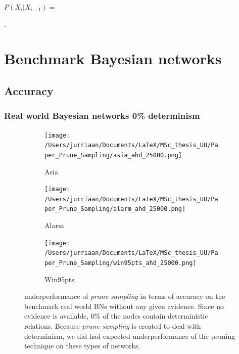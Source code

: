 \documentclass[a4paper, twoside, 11pt]{report}
\theoremstyle{plain}
\theoremstyle{definition}
\theoremstyle{remark}
\newcommand{\ps}{\textit{prune sampling }}
\begin{document}
\vspace{2pc}
$P(X_i |X_{i-1})=$
\begin{table}[h]
\centering
{}.
\caption{a block shaped CPT}
\label{block}
\end{table}

\section{Benchmark Bayesian networks}
\subsection{Accuracy}
\subsubsection{Real world Bayesian networks 0\% determinism}\label{real_world_no_evidence}

\begin{figure}[H]
\centering
\begin{subfigure}{0.5\textwidth}
\texttt{[image: /Users/jurriaan/Documents/LaTeX/MSc\_thesis\_UU/Paper\_Prune\_Sampling/asia\_ahd\_25000.png]}
\caption{Asia}%
\label{asia}%
\end{subfigure}\hfill%
\begin{subfigure}{0.5\textwidth}
\texttt{[image: /Users/jurriaan/Documents/LaTeX/MSc\_thesis\_UU/Paper\_Prune\_Sampling/alarm\_ahd\_25000.png]}
\caption{Alarm}%
\label{alarm}%
\end{subfigure}%
\begin{subfigure}{0.5\textwidth}
\texttt{[image: /Users/jurriaan/Documents/LaTeX/MSc\_thesis\_UU/Paper\_Prune\_Sampling/win95pts\_ahd\_25000.png]}
\caption{Win95pts}%
\label{win95pts}%
\end{subfigure}\hfill%
\vspace{0.75pc}
\caption{underperformance of \ps in terms of accuracy on the benchmark real world BNs without any given evidence. Since no evidence is available, 0\% of the nodes contain deterministic relations. Because \ps is created to deal with determinism, we did had expected underperformance of the pruning technique on these types of networks.  }
\label{results2}
\end{figure}
\end{document}
